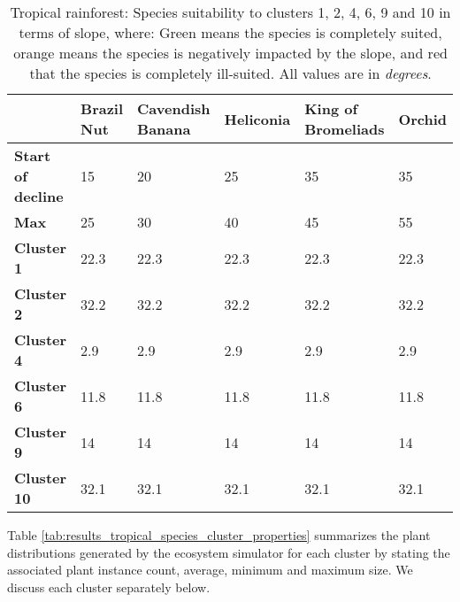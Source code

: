 \begin{table}[htb!]
  \centering
	    \begin{tabular}{|p{2cm}|p{2.5cm}|p{2.5cm}|p{2.5cm}|p{2.5cm}|p{2.5cm}|}
		\hline	
  	     & \textbf{Brazil Nut} & \textbf{Cavendish Banana} & \textbf{Heliconia} & \textbf{King of Bromeliads} & \textbf{Orchid} \\
  	    \hline	
		\textbf{Start of decline} & 
		15 & 
		20 & 
		25 &
		35 & 
		35 \\
		\hline
		\textbf{Max} & 
		25 &
		30 &
		40 &
		45 & 
		55 \\
		\hline
		\textbf{Cluster 1} & 
		\cellcolor{color_orange}22.3 &
		\cellcolor{color_orange}22.3 &
		\cellcolor{color_green}22.3 &
		\cellcolor{color_green}22.3 &
		\cellcolor{color_green}22.3 \\
		\hline
		\textbf{Cluster 2} & 
		\cellcolor{color_red}32.2 &
		\cellcolor{color_red}32.2 &
		\cellcolor{color_orange}32.2 &
		\cellcolor{color_green}32.2 &
		\cellcolor{color_green}32.2 \\
		\hline
		\textbf{Cluster 4} & 
		\cellcolor{color_green}2.9 & 
		\cellcolor{color_green}2.9 &
		\cellcolor{color_green}2.9 &
		\cellcolor{color_green}2.9 &
		\cellcolor{color_green}2.9 \\
		\hline
		\textbf{Cluster 6} & 
		\cellcolor{color_green}11.8 & 
		\cellcolor{color_green}11.8 &
		\cellcolor{color_green}11.8 &
		\cellcolor{color_green}11.8 &
		\cellcolor{color_green}11.8 \\
		\hline
		\textbf{Cluster 9} & 
		\cellcolor{color_green}14 & 
		\cellcolor{color_green}14 &
		\cellcolor{color_green}14 &
		\cellcolor{color_green}14 &
		\cellcolor{color_green}14 \\
		\hline
		\textbf{Cluster 10} & 
		\cellcolor{color_red}32.1 & 
		\cellcolor{color_red}32.1 &
		\cellcolor{color_orange}32.1 &
		\cellcolor{color_green}32.1 &
		\cellcolor{color_green}32.1 \\
		\hline
		\end{tabular}
		\caption{Tropical rainforest: Species suitability to clusters 1, 2, 4, 6, 9 and 10 in terms of slope, where: Green means the species is completely suited, orange means the species is negatively impacted by the slope, and red that the species is completely ill-suited. All values are in \textit{degrees}.}
	  \label{tab:results_tropical_species_slope_suitability}
\end{table}

Table \ref{tab:results_tropical_species_cluster_properties} summarizes the plant distributions generated by the ecosystem simulator for each cluster by stating the associated plant instance count, average, minimum and maximum size. We discuss each cluster separately below. \\

